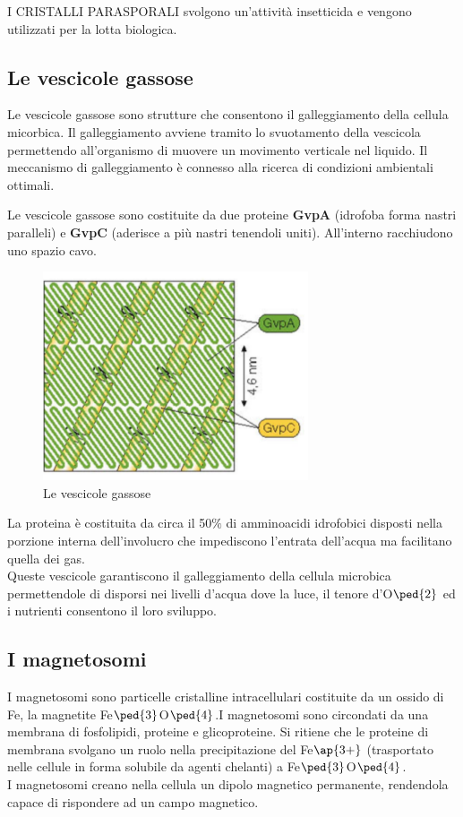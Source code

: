 \documentclass[11pt]{book}
\begin{document}
I CRISTALLI PARASPORALI svolgono un'attività insetticida e vengono utilizzati per la lotta biologica.

\subsection{Le vescicole gassose}

Le vescicole gassose sono strutture che consentono il galleggiamento della cellula micorbica. Il galleggiamento avviene tramito lo svuotamento della vescicola permettendo all'organismo di muovere un movimento verticale nel liquido. Il meccanismo di galleggiamento è connesso alla ricerca di condizioni ambientali ottimali.

\vspace{1em}
Le vescicole gassose sono costituite da due proteine \textbf{GvpA} (idrofoba forma nastri paralleli) e \textbf{GvpC} (aderisce a più nastri tenendoli uniti). All’interno racchiudono uno spazio cavo.\\

\begin{figure}[htp]
\centering
\includegraphics[scale=0.5]{img/Vescicole gassose.png}
\caption{Le vescicole gassose}
\label{}
\end{figure}

La proteina è costituita da circa il 50$\%$ di amminoacidi idrofobici disposti nella porzione interna dell’involucro che impediscono l’entrata dell’acqua ma facilitano quella dei gas.\\
Queste vescicole garantiscono il galleggiamento della cellula microbica permettendole di disporsi nei livelli d’acqua dove la luce, il tenore d’O$\ped{2}$ ed i nutrienti consentono il loro sviluppo.

\subsection{I magnetosomi}
I magnetosomi sono particelle cristalline intracellulari costituite da un ossido di Fe, la magnetite Fe$\ped{3}$O$\ped{4}$.I magnetosomi sono circondati da una membrana di fosfolipidi, proteine e glicoproteine. Si ritiene che le proteine di membrana svolgano un ruolo nella
precipitazione del Fe$\ap{3+}$ (trasportato nelle cellule in forma solubile da agenti chelanti) a Fe$\ped{3}$O$\ped{4}$.\\
I magnetosomi creano nella cellula un dipolo magnetico permanente, rendendola capace di rispondere ad un campo magnetico.\\
\end{document}
